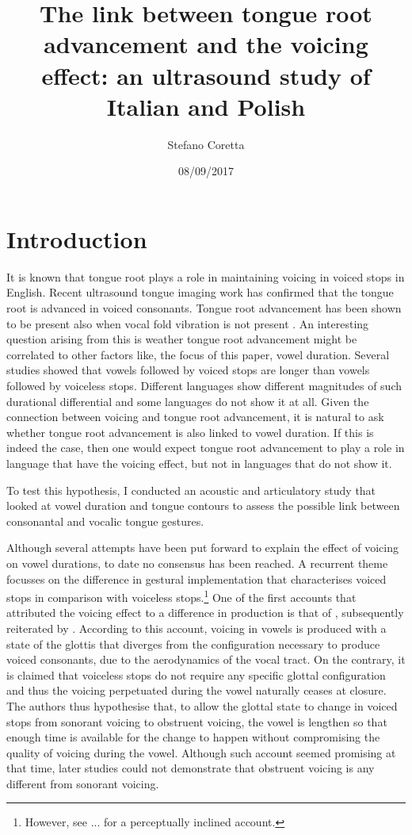 \documentclass[authoryear]{elsarticle}
\title{The link between tongue root advancement and the voicing effect: an
ultrasound study of Italian and Polish}
\author{Stefano Coretta}
\date{08/09/2017}
\begin{document}
\maketitle

\section{Introduction}\label{introduction}

It is known that tongue root plays a role in maintaining voicing in
voiced stops in English. Recent ultrasound tongue imaging work has
confirmed that the tongue root is advanced in voiced consonants. Tongue
root advancement has been shown to be present also when vocal fold
vibration is not present \citep{ahn2016}. An interesting question
arising from this is weather tongue root advancement might be correlated
to other factors like, the focus of this paper, vowel duration. Several
studies showed that vowels followed by voiced stops are longer than
vowels followed by voiceless stops. Different languages show different
magnitudes of such durational differential and some languages do not
show it at all. Given the connection between voicing and tongue root
advancement, it is natural to ask whether tongue root advancement is
also linked to vowel duration. If this is indeed the case, then one
would expect tongue root advancement to play a role in language that
have the voicing effect, but not in languages that do not show it.

To test this hypothesis, I conducted an acoustic and articulatory study
that looked at vowel duration and tongue contours to assess the possible
link between consonantal and vocalic tongue gestures.

Although several attempts have been put forward to explain the effect of
voicing on vowel durations, to date no consensus has been reached. A
recurrent theme focusses on the difference in gestural implementation
that characterises voiced stops in comparison with voiceless
stops.\footnote{However, see ... for a perceptually inclined account.}
One of the first accounts that attributed the voicing effect to a
difference in production is that of \citet{halle1967}, subsequently
reiterated by \citet{chomsky1968}. According to this account, voicing in
vowels is produced with a state of the glottis that diverges from the
configuration necessary to produce voiced consonants, due to the
aerodynamics of the vocal tract. On the contrary, it is claimed that
voiceless stops do not require any specific glottal configuration and
thus the voicing perpetuated during the vowel naturally ceases at
closure. The authors thus hypothesise that, to allow the glottal state
to change in voiced stops from sonorant voicing to obstruent voicing,
the vowel is lengthen so that enough time is available for the change to
happen without compromising the quality of voicing during the vowel.
Although such account seemed promising at that time, later studies could
not demonstrate that obstruent voicing is any different from sonorant
voicing.
\end{document}
